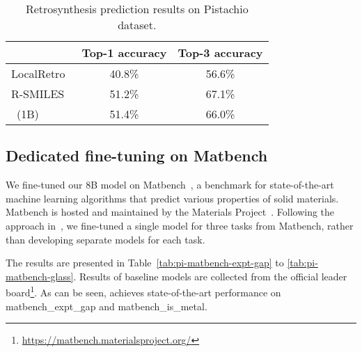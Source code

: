 \begin{table}[!h]

\centering
\begin{tabular}{lcc}
\toprule
& Top-1 accuracy & Top-3 accuracy \\
\midrule
LocalRetro~\cite{chen2021localretro} & 40.8\% & 56.6\% \\
R-SMILES~\cite{Zhong2022rsmiles} & 51.2\% & 67.1\% \\ 
\midrule
\ourM{}~(1B) & 51.4\% & 66.0\% \\
\bottomrule
\end{tabular}
\caption{Retrosynthesis prediction results on Pistachio dataset.}
\label{tab:retro-pistachio}
\end{table}

\subsection{Dedicated fine-tuning on Matbench}\label{sec:dedicate_tune_matbench}
We fine-tuned our \ourM{} 8B model on Matbench~\cite{matbench}, a benchmark for state-of-the-art machine learning algorithms that predict various properties of solid materials. Matbench is hosted and maintained by the Materials Project~\cite{materialsproject}. Following the approach in~\cite{xie2023darwin}, we fine-tuned a single model for three tasks from Matbench, rather than developing separate models for each task. 

The results are presented in Table~\ref{tab:pi-matbench-expt-gap} to  \ref{tab:pi-matbench-glass}. Results of baseline models are collected from the official leader board\footnote{\url{https://matbench.materialsproject.org/}}. As can be seen, \ourM{} achieves state-of-the-art performance on matbench\_expt\_gap and matbench\_is\_metal. 

